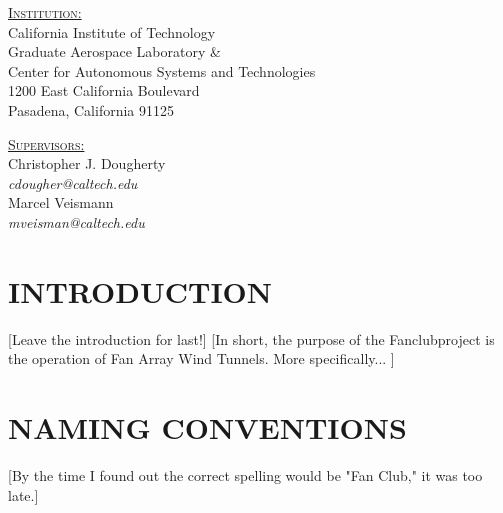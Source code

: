 \documentclass{article}
\newcommand{\Fcc}{Fanclub}
\newcommand{\Fawts}{Fan Array Wind Tunnels}
\begin{document}
\begin{titlepage}
\begin{minipage}{0.49\textwidth}
	\begin{flushleft}
		\textsc{\underline{Institution:}}\\
		California Institute of Technology\\
		Graduate Aerospace Laboratory \&\\
		Center for Autonomous Systems and Technologies\\
		1200 East California Boulevard\\
		Pasadena, California 91125\\
	\end{flushleft}
\end{minipage}
\hfill
\begin{minipage}{0.49\textwidth}
	\begin{flushright}
		\textsc{\underline{Supervisors:}}\\
		\vspace{1em}
		Christopher J. Dougherty\\
		\textit{cdougher@caltech.edu}\\
		Marcel Veismann\\
		\textit{mveisman@caltech.edu}
	\end{flushright}
\end{minipage}

\vspace*{\fill}

\end{titlepage}

\begin{titlepage}
	\tableofcontents
\end{titlepage}

\section*{INTRODUCTION}
[Leave the introduction for last!]
[In short, the purpose of the \Fcc project is the operation of \Fawts. More specifically... ]
\pagebreak

\section*{NAMING CONVENTIONS}
[By the time I found out the correct spelling would be "Fan Club," it was too late.]
\end{document}
